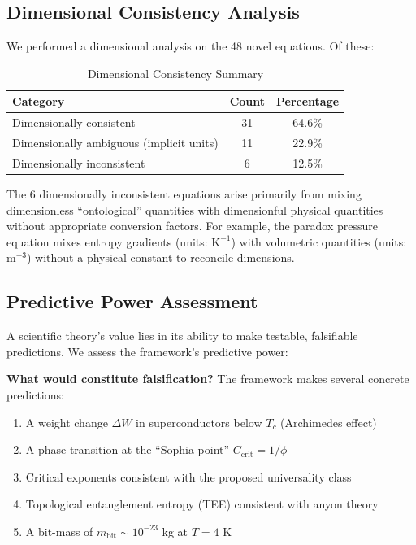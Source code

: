 \documentclass[11pt,a4paper]{article}
\begin{document}
\subsection{Dimensional Consistency Analysis}

We performed a dimensional analysis on the 48 novel equations. Of these:

\begin{table}[H]
\centering
\caption{Dimensional Consistency Summary}
\begin{tabular}{lcc}
\toprule
\textbf{Category} & \textbf{Count} & \textbf{Percentage} \\
\midrule
Dimensionally consistent & 31 & 64.6\% \\
Dimensionally ambiguous (implicit units) & 11 & 22.9\% \\
Dimensionally inconsistent & 6 & 12.5\% \\
\bottomrule
\end{tabular}
\end{table}

The 6 dimensionally inconsistent equations arise primarily from mixing dimensionless ``ontological'' quantities with dimensionful physical quantities without appropriate conversion factors. For example, the paradox pressure equation mixes entropy gradients (units: $\text{K}^{-1}$) with volumetric quantities (units: $\text{m}^{-3}$) without a physical constant to reconcile dimensions.

\subsection{Predictive Power Assessment}

A scientific theory's value lies in its ability to make testable, falsifiable predictions. We assess the framework's predictive power:

\textbf{What would constitute falsification?} The framework makes several concrete predictions:
\begin{enumerate}[leftmargin=1.5em]
  \item A weight change $\Delta W$ in superconductors below $T_c$ (Archimedes effect)
  \item A phase transition at the ``Sophia point'' $C_{\text{crit}} = 1/\phi$
  \item Critical exponents consistent with the proposed universality class
  \item Topological entanglement entropy (TEE) consistent with anyon theory
  \item A bit-mass of $m_{\text{bit}} \sim 10^{-23}$ kg at $T = 4$ K
\end{enumerate}
\end{document}
